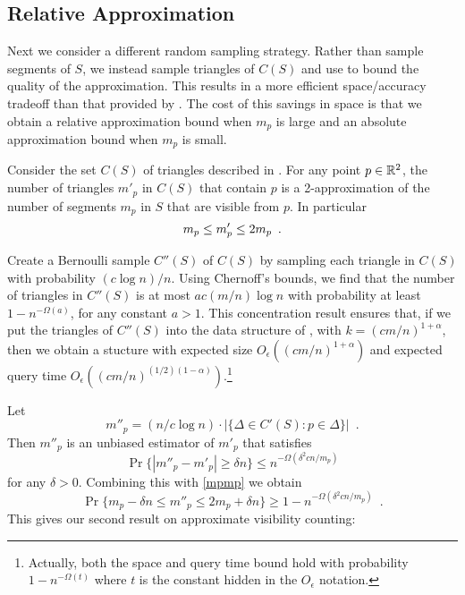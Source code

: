 \documentclass{patmorin}
\newcommand{\Oe}{O_\epsilon}
\begin{document}
\subsection{Relative Approximation}

Next we consider a different random sampling strategy.  Rather than
sample segments of $S$, we instead sample triangles of $C(S)$ and use
 to bound the quality of the approximation.  This results
in a more efficient space/accuracy tradeoff than that provided by
.  The cost of this savings in space is that we
obtain a relative approximation bound when $m_p$ is large and an absolute
approximation bound when $m_p$ is small.

Consider the set $C(S)$ of triangles described in .
For any point $p\in\mathbb{R}^2$, the number of triangles $m'_p$ in $C(S)$ that
contain $p$ is a 2-approximation of the number of segments $m_p$ in $S$
that are visible from $p$.  In particular
\begin{equation}
   m_p \le m'_p \le 2m_p \enspace . \eqlabel{mpmp}
\end{equation}

Create a Bernoulli sample $C''(S)$ of $C(S)$ by sampling each
triangle in $C(S)$ with probability $(c\log n)/ n$.  Using Chernoff's
bounds, we find that the number of triangles in $C''(S)$ is at
most $ac(m/n)\log n$ with probability at least $1-n^{-\Omega(a)}$,
for any constant $a>1$.  This concentration result ensures that,
if we put the triangles of $C''(S)$ into the data structure of
, with $k=(cm/n)^{1+\alpha}$, then we obtain a
stucture with expected size $\Oe((cm/n)^{1+\alpha})$ and expected query
time $\Oe((cm/n)^{(1/2)(1-\alpha)})$.\footnote{Actually, both the space
and query time bound hold with probability $1-n^{-\Omega(t)}$ where $t$
is the constant hidden in the $\Oe$ notation.}

Let
\[
   m''_p= (n/c\log n)\cdot|\{\Delta\in C'(S): p\in \Delta\}| \enspace .
\]
Then $m''_p$ is an unbiased estimator of $m'_p$ that satisfies
\[
   \Pr\{|m''_p - m'_p| \ge \delta n\} \le n^{-\Omega(\delta^2cn/m_p)}
\]
for any $\delta > 0$.  Combining this with \eqref{mpmp} we obtain
\[
   \Pr\{m_p-\delta n \le m''_p \le 2m_p+\delta n\} 
     \ge 1-n^{-\Omega(\delta^2 cn/m_p)}  \enspace .
\]
This gives our second result on approximate visibility counting:
\end{document}
